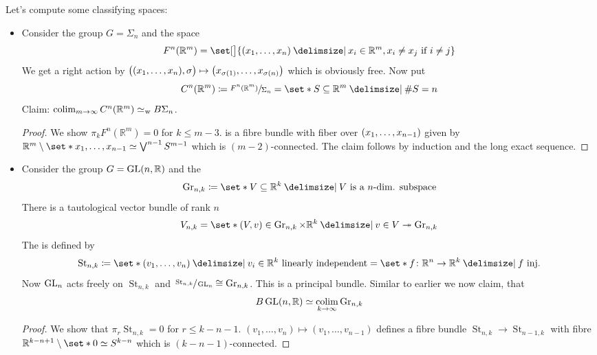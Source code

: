 \begin{example}
	Let's compute some classifying spaces:
	\begin{itemize}
		\item Consider the group $G= \Sigma_n$ and the space
		\[
			F^n(\mathbb{R}^m) = \set[\big]{(x_1,\ldots ,x_n) \given x_i \in \mathbb{R}^m, x_i \neq x_j \text{ if } i\neq j}
		\]
		We get a right action by $\enbrace[\big]{\enbrace*{x_1, \ldots ,x_n}, \sigma} \mapsto \enbrace*{x_{\sigma(1)}, \ldots , x_{\sigma(n)}}$ which is obviously free. 
		Now put
		\[
			C^n(\mathbb{R}^m) \coloneqq \sfrac{F^n(\mathbb{R}^m)}{\Sigma_n} = \set*{S \subseteq \mathbb{R}^m \given \#S = n}
		\]
		Claim: $\colim_{m \to \infty} C^n(\mathbb{R}^m) \simeq_{\w} B\Sigma_n$.
		
		\begin{proof}
			We show $\pi_k F^n(\mathbb{R}^m) =0$ for $k \le m-3$.
			is a fibre bundle with fiber over $\enbrace*{x_1, \ldots ,x_{n-1}}$ given by $\mathbb{R}^m \setminus \set*{x_1, \ldots ,x_{n-1}} \simeq \bigvee^{n-1} S^{m-1}$ which is $(m-2)$-connected.
			The claim follows by induction and the long exact sequence.
		\end{proof}
		\item Consider the group $G = \GL(n,\mathbb{R})$ and the  
		\[
			\operatorname{Gr}_{n,k} \coloneqq \set*{V \subseteq \mathbb{R}^k \given V \text{ is a $n$-dim. subspace}}
		\]
		There is a tautological vector bundle of rank $n$
		\[
			V_{n,k} = \set*{(V,v) \in \operatorname{Gr}_{n,k} \times \mathbb{R}^k \given v \in V} \twoheadrightarrow \operatorname{Gr}_{n,k}
		\]
		The  is defined by
		\[
			\operatorname{St}_{n,k} \coloneqq \set*{(v_1, \ldots ,v_n) \given v_i \in \mathbb{R}^k \text{ linearly independent} } = \set*{f \colon \mathbb{R}^n \to \mathbb{R}^k \given f \text{ inj.} }
		\]
		Now $\GL_n$ acts freely on $\operatorname{St}_{n,k}$ and $\sfrac{\operatorname{St}_{n,k}}{\GL_n} \cong \operatorname{Gr}_{n,k}$.
		This is a principal bundle.
		Similar to earlier we now claim, that
		\[
			B \GL(n,\mathbb{R}) \simeq \colim_{k \to \infty} \operatorname{Gr}_{n,k}
		\]
		\begin{proof}
			We show that $\pi_r \operatorname{St}_{n,k} =0$ for $r \le k-n-1$.
			$(v_1, \ldots ,v_n) \mapsto (v_1, \ldots ,v_{n-1})$ defines a fibre bundle ${\operatorname{St}_{n,k}} \to {\operatorname{St}_{n-1,k}}$ with fibre $\mathbb{R}^{k-n+1} \setminus \set*{0} \simeq S^{k-n}$ which is $(k-n-1)$-connected.
		\end{proof}
	\end{itemize}
\end{example}




